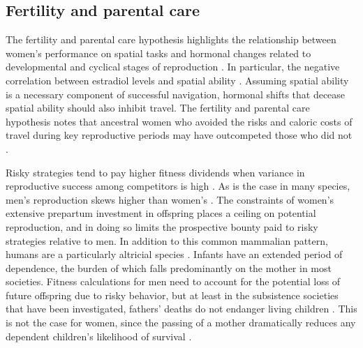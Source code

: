 	\subsection{Fertility and parental care}
	\label{sec:1.1}
The fertility and parental care hypothesis highlights the relationship between women's performance on spatial tasks and hormonal changes related to developmental and cyclical stages of reproduction \citep{hampson1988reciprocal, mccormick2001menstrual}.  In particular, the negative correlation between estradiol levels and spatial ability \citep{hausmann2000sex}.  Assuming spatial ability is a necessary component of successful navigation, hormonal shifts that decease spatial ability should also inhibit travel.  The fertility and parental care hypothesis notes that ancestral women who avoided the risks and caloric costs of travel during key reproductive periods may have outcompeted those who did not \citep{sherry1997evolution}.  

	
Risky strategies tend to pay higher fitness dividends when variance in reproductive success among competitors is high \citep{darwin1871sexual, bateman1948intra, clutton2007sexual}.  As is the case in many species, men's reproduction skews higher than women's \citep{trivers1972parental, wilson1985competitiveness}.  The constraints of women's extensive prepartum investment in offspring places a ceiling on potential reproduction, and in doing so limits the prospective bounty paid to risky strategies relative to men.  In addition to this common mammalian pattern, humans are a particularly altricial species \citep{montagu1961neonatal}.  Infants have an extended period of dependence, the burden of which falls predominantly on the mother in most societies.  Fitness calculations for men need to account for the potential loss of future offspring due to risky behavior, but at least in the subsistence societies that have been investigated, fathers' deaths do not endanger living children \citep{sear2008keeps}.  This is not the case for women, since the passing of a mother dramatically reduces any dependent children's likelihood of survival \citep{hill1996ache, sear2008keeps}.  


